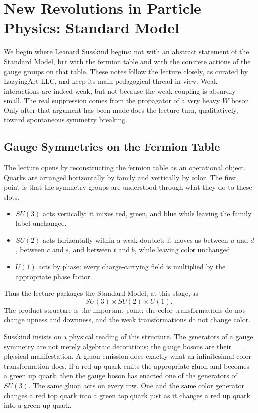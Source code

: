 \chapter{New Revolutions in Particle Physics: Standard Model}

We begin where Leonard Susskind begins: not with an abstract statement of the Standard Model, but with the fermion table and with the concrete actions of the gauge groups on that table. These notes follow the lecture closely, as curated by LazyingArt LLC, and keep its main pedagogical thread in view. Weak interactions are indeed weak, but not because the weak coupling is absurdly small. The real suppression comes from the propagator of a very heavy \(W\) boson. Only after that argument has been made does the lecture turn, qualitatively, toward spontaneous symmetry breaking.

\section{Gauge Symmetries on the Fermion Table}

The lecture opens by reconstructing the fermion table as an operational object. Quarks are arranged horizontally by family and vertically by color. The first point is that the symmetry groups are understood through what they do to these slots.

\begin{itemize}
\item \(SU(3)\) acts vertically: it mixes red, green, and blue while leaving the family label unchanged.
\item \(SU(2)\) acts horizontally within a weak doublet: it moves us between \(u\) and \(d\), between \(c\) and \(s\), and between \(t\) and \(b\), while leaving color unchanged.
\item \(U(1)\) acts by phase: every charge-carrying field is multiplied by the appropriate phase factor.
\end{itemize}

Thus the lecture packages the Standard Model, at this stage, as
\begin{equation}
SU(3)\times SU(2)\times U(1).
\end{equation}
The product structure is the important point: the color transformations do not change upness and downness, and the weak transformations do not change color.

Susskind insists on a physical reading of this structure. The generators of a gauge symmetry are not merely algebraic decorations; the gauge bosons are their physical manifestation. A gluon emission does exactly what an infinitesimal color transformation does. If a red up quark emits the appropriate gluon and becomes a green up quark, then the gauge boson has enacted one of the generators of \(SU(3)\). The same gluon acts on every row. One and the same color generator changes a red top quark into a green top quark just as it changes a red up quark into a green up quark.

